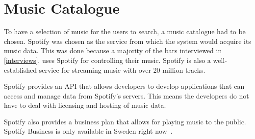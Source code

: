 \section{Music Catalogue}
\label{sec:Music_catalog}
To have a selection of music for the users to search, a music catalogue had to be chosen. Spotify was chosen as the service from which the system would acquire its music data. This was done because a majority of the bars interviewed in \cref{interviews}, uses Spotify for controlling their music. Spotify is also a well-established service for streaming music with over 20 million tracks.

Spotify provides an API that allows developers to develop applications that can access and manage data from Spotify’s servers. This means the developers do not have to deal with licensing and hosting of music data.

Spotify also provides a business plan that allows for playing music to the public. Spotify Business is only available in Sweden right now~\cite{spotifyBusiness}.
